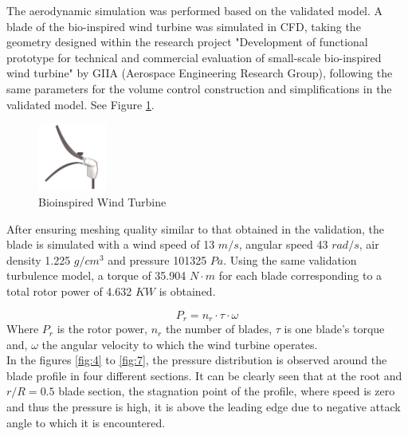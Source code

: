 The aerodynamic simulation was performed based on the validated model. A blade of the bio-inspired wind turbine was simulated in CFD, taking the geometry designed within the research project "Development of functional prototype for technical and commercial evaluation of small-scale bio-inspired wind turbine" by GIIA (Aerospace Engineering Research Group), following the same parameters for the volume control construction and simplifications in the validated model. See Figure \ref{fig:3}.

\begin{figure}[H]
  \includegraphics[width=0.2\textwidth]{Rotor}%
\caption{Bioinspired Wind Turbine}
\label{fig:3}       %
\end{figure}
\vspace{-0.3cm}
After ensuring meshing quality similar to that obtained in the validation,  the blade is simulated with a wind speed of 13 $m/s$, angular speed 43 $rad/s$, air density 1.225 $g/cm^3$ and pressure 101325 $Pa$. Using the same validation turbulence model, a torque of 35.904 $N\cdot m$ for each blade corresponding to a total rotor power of 4.632 $KW$ is obtained.

\begin{equation}
P_r = n_r\cdot \tau\cdot \omega
\end{equation}
Where $P_r$ is the rotor power,  $n_r$ the number of blades,  $\tau$ is one blade’s torque and, $\omega$ the angular velocity to which the wind turbine operates. \\ 

In the figures \ref{fig:4} to \ref{fig:7}, the pressure distribution is observed around the blade profile in four different sections. It can be clearly seen that at the root and $r/R= 0.5$ blade section, the stagnation point of the profile, where speed is zero and thus the pressure is high, it is above the leading edge due to negative attack angle to which it is encountered.

